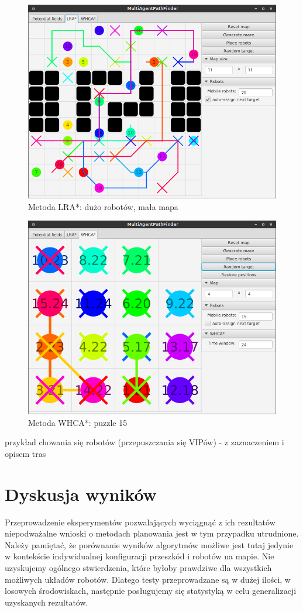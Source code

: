 
\begin{figure}
	\centering
	\includegraphics[width=0.8\columnwidth]{img/robopath/lra-lot-robots}
	\caption{Metoda LRA*: dużo robotów, mała mapa}
	\label{fig:test-lra-lot-robots}
\end{figure}

\begin{figure}
	\centering
	\includegraphics[width=0.8\columnwidth]{img/robopath/puzzle-15}
	\caption{Metoda WHCA*: puzzle 15}
	\label{fig:test-puzzle-15}
\end{figure}

przykład chowania się robotów (przepuszczania się VIPów) - z zaznaczeniem i opisem tras

\section{Dyskusja wyników}
Przeprowadzenie eksperymentów pozwalających wyciągnąć z ich rezultatów niepodważalne wnioski o metodach planowania jest w tym przypadku utrudnione.
Należy pamiętać, że porównanie wyników algorytmów możliwe jest tutaj jedynie w kontekście indywidualnej konfiguracji przeszkód i robotów na mapie.
Nie uzyskujemy ogólnego stwierdzenia, które byłoby prawdziwe dla wszystkich możliwych układów robotów.
Dlatego testy przeprowadzane są w dużej ilości, w losowych środowiskach, następnie posługujemy się statystyką w celu generalizacji uzyskanych rezultatów.

